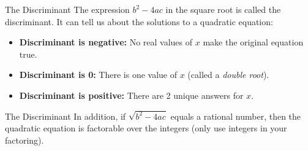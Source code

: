 \documentclass[t]{beamer}
\begin{document}
\begin{frame}{The Discriminant}
The expression {\color{blue}$b^2-4ac$} in the square root is called the \alert{discriminant}. It can tell us about the solutions to a quadratic equation:	\newline\\	\pause

\begin{itemize}
	\item \textbf{Discriminant is negative:} No real values of $x$ make the original equation true. \newline\\ \pause
	\item \textbf{Discriminant is 0:} There is one value of $x$ (called a \emph{double root}). \newline\\ \pause
	\item \textbf{Discriminant is positive:} There are 2 unique answers for $x$.
\end{itemize}
\end{frame}

\begin{frame}{The Discriminant}
In addition, if $\sqrt{b^2 - 4ac}$ equals a \alert{rational number}, then the quadratic equation is factorable over the integers (only use integers in your factoring).
\end{frame}
\end{document}

